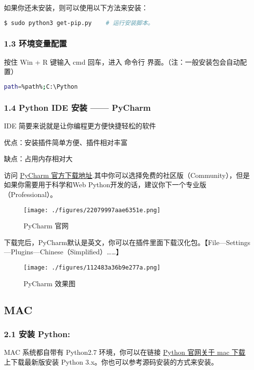 如果你还未安装，则可以使用以下方法来安装：

\begin{lstlisting}[language=bash]
$ sudo python3 get-pip.py    # 运行安装脚本。
\end{lstlisting}

\subsubsection{1.3 环境变量配置}

按住 Win + R 键输入 cmd 回车，进入 命令行 界面。（注：一般安装包会自动配置）

\begin{lstlisting}[language=bash]
path=%path%;C:\Python 
\end{lstlisting}

\subsubsection{1.4 Python IDE 安装 —— PyCharm}

IDE 简要来说就是让你编程更方便快捷轻松的软件

优点：安装插件简单方便、插件相对丰富

缺点：占用内存相对大

访问 \href{http://www.jetbrains.com/pycharm/download/}{PyCharm 官方下载地址}.其中你可以选择免费的社区版（Community），但是如果你需要用于科学和Web Python开发的话，建议你下一个专业版（Professional）。

\begin{figure}[ht]
\centering
\texttt{[image: ./figures/22079997aae6351e.png]}
\caption{PyCharm 官网} \label{fig_PyIDE_1}
\end{figure}

下载完后，PyCharm默认是英文，你可以在插件里面下载汉化包。【File—Settings—Plugins—Chinese（Simplified）……】

\begin{figure}[ht]
\centering
\texttt{[image: ./figures/112483a36b9e277a.png]}
\caption{PyCharm 效果图} \label{fig_PyIDE_2}
\end{figure}

\subsection{MAC}\label{sub_Pyc1_2}

\subsubsection{2.1 安装 Python:}
MAC 系统都自带有 Python2.7 环境，你可以在链接 \href{https://www.python.org/downloads/mac-osx/}{Python 官网关于 mac 下载} 上下载最新版安装 Python 3.x。你也可以参考源码安装的方式来安装。

